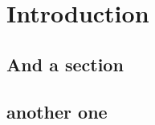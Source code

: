 \documentclass[main.tex]{subfiles}
\begin{document}
\chapter{Introduction}

\section{And a section}
\section{another one}
\end{document}
